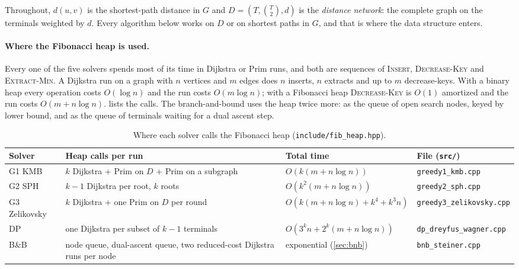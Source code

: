 \documentclass[11pt,a4paper]{article}
\theoremstyle{plain}\newtheorem{theorem}{Theorem}[section]
\theoremstyle{definition}\newaliascnt{definition}{theorem}\newtheorem{definition}[definition]{Definition}\aliascntresetthe{definition}
\begin{document}
Throughout, \(d(u,v)\) is the shortest-path distance in \(G\) and \(D=(T,\binom{T}{2},d)\) is the \emph{distance
network}: the complete graph on the terminals weighted by \(d\). Every algorithm below works on \(D\) or on
shortest paths in \(G\), and that is where the data structure enters.

\paragraph{Where the Fibonacci heap is used.}
Every one of the five solvers spends most of its time in Dijkstra or Prim runs, and both are sequences of
\textsc{Insert}, \textsc{Decrease-Key} and \textsc{Extract-Min}. A Dijkstra run on a graph with \(n\) vertices and
\(m\) edges does \(n\) inserts, \(n\) extracts and up to \(m\) decrease-keys. With a binary heap every operation costs
\(O(\log n)\) and the run costs \(O(m\log n)\); with a Fibonacci heap \textsc{Decrease-Key} is \(O(1)\) amortized and the
run costs \(O(m+n\log n)\).  lists the calls. The branch-and-bound uses the heap twice more: as
the queue of open search nodes, keyed by lower bound, and as the queue of terminals waiting for a dual ascent step.

\begin{table}[H]\centering\small
\begin{tabular}{@{}l>{\raggedright\arraybackslash}p{4.9cm}l>{\footnotesize}l@{}}\toprule
Solver & Heap calls per run & Total time & File (\texttt{src/})\\\midrule
G1 KMB & \(k\) Dijkstra + Prim on \(D\) + Prim on a subgraph & \(O(k(m+n\log n))\) & \texttt{greedy1\_kmb.cpp}\\
G2 SPH & \(k-1\) Dijkstra per root, \(k\) roots & \(O(k^2(m+n\log n))\) & \texttt{greedy2\_sph.cpp}\\
G3 Zelikovsky & \(k\) Dijkstra + one Prim on \(D\) per round & \(O(k(m+n\log n)+k^4+k^3n)\) & \texttt{greedy3\_zelikovsky.cpp}\\
DP & one Dijkstra per subset of \(k-1\) terminals & \(O(3^{k}n+2^{k}(m+n\log n))\) & \texttt{dp\_dreyfus\_wagner.cpp}\\
B\&B & node queue, dual-ascent queue, two reduced-cost Dijkstra runs per node & exponential (\cref{sec:bnb}) & \texttt{bnb\_steiner.cpp}\\\bottomrule
\end{tabular}
\caption{Where each solver calls the Fibonacci heap (\texttt{include/fib\_heap.hpp}).}\label{tab:usage}
\end{table}
\end{document}
